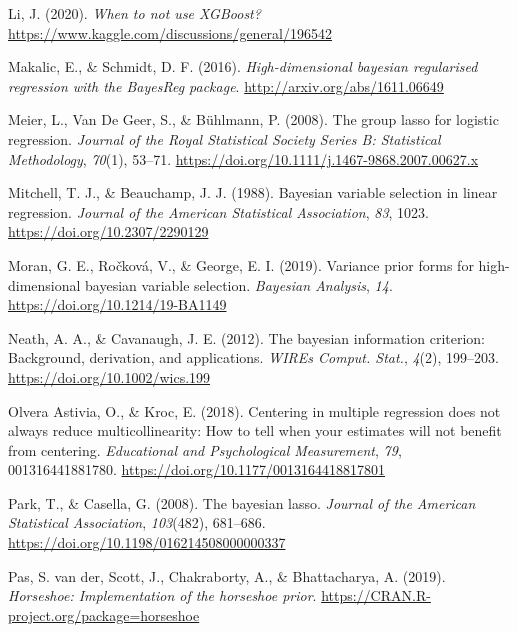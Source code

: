 \documentclass[
  11pt,
]{article}
\newlength{\cslhangindent}
\newlength{\cslentryspacingunit} %
\newenvironment{CSLReferences}[2] %
 {%
  \setlength{\parindent}{0pt}
  \ifodd #1
  \let\oldpar\par
  \def\par{\hangindent=\cslhangindent\oldpar}
  \fi
  \setlength{\parskip}{#2\cslentryspacingunit}
 }%
 {}
\begin{document}
\begin{CSLReferences}{1}{0}
\leavevmode{}%
Li, J. (2020). \emph{When to not use XGBoost?}
\url{https://www.kaggle.com/discussions/general/196542}

\leavevmode{}%
Makalic, E., \& Schmidt, D. F. (2016). \emph{High-dimensional bayesian
regularised regression with the BayesReg package}.
\url{http://arxiv.org/abs/1611.06649}

\leavevmode{}%
Meier, L., Van De Geer, S., \& Bühlmann, P. (2008). The group lasso for
logistic regression. \emph{Journal of the Royal Statistical Society
Series B: Statistical Methodology}, \emph{70}(1), 53--71.
\url{https://doi.org/10.1111/j.1467-9868.2007.00627.x}

\leavevmode{}%
Mitchell, T. J., \& Beauchamp, J. J. (1988). Bayesian variable selection
in linear regression. \emph{Journal of the American Statistical
Association}, \emph{83}, 1023. \url{https://doi.org/10.2307/2290129}

\leavevmode{}%
Moran, G. E., Ročková, V., \& George, E. I. (2019). Variance prior forms
for high-dimensional bayesian variable selection. \emph{Bayesian
Analysis}, \emph{14}. \url{https://doi.org/10.1214/19-BA1149}

\leavevmode{}%
Neath, A. A., \& Cavanaugh, J. E. (2012). The bayesian information
criterion: Background, derivation, and applications. \emph{WIREs Comput.
Stat.}, \emph{4}(2), 199--203. \url{https://doi.org/10.1002/wics.199}

\leavevmode{}%
Olvera Astivia, O., \& Kroc, E. (2018). Centering in multiple regression
does not always reduce multicollinearity: How to tell when your
estimates will not benefit from centering. \emph{Educational and
Psychological Measurement}, \emph{79}, 001316441881780.
\url{https://doi.org/10.1177/0013164418817801}

\leavevmode{}%
Park, T., \& Casella, G. (2008). The bayesian lasso. \emph{Journal of
the American Statistical Association}, \emph{103}(482), 681--686.
\url{https://doi.org/10.1198/016214508000000337}

\leavevmode{}%
Pas, S. van der, Scott, J., Chakraborty, A., \& Bhattacharya, A. (2019).
\emph{Horseshoe: Implementation of the horseshoe prior}.
\url{https://CRAN.R-project.org/package=horseshoe}


\end{CSLReferences}
\end{document}
